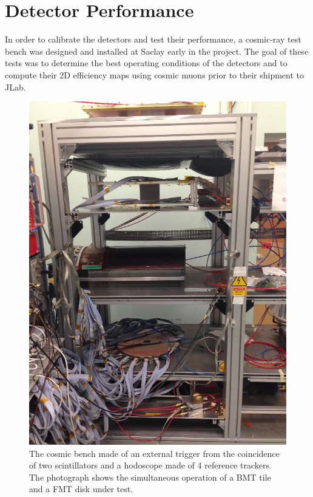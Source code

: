 \section{Detector Performance}

In order to calibrate the detectors and test their performance, a cosmic-ray test bench was designed and installed at
Saclay early in the project. The goal of these tests was to determine the best operating conditions of the detectors and
to compute their 2D efficiency maps using cosmic muons prior to their shipment to JLab.

\begin{figure}[htb]
 \includegraphics[width=1.0\columnwidth,keepaspectratio]{images/banc_cosmique}
 \caption{The cosmic bench made of an external trigger from the coincidence of two scintillators and a hodoscope made
   of 4 reference trackers. The photograph shows the simultaneous operation of a BMT tile and a FMT disk under test.}
 \label{fig:mm-testbench}
\end{figure}

